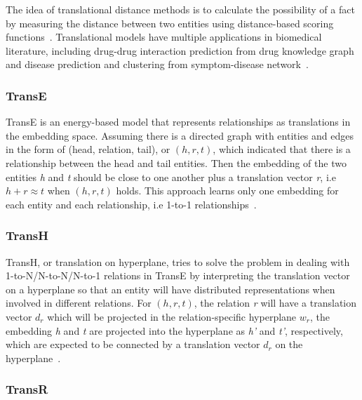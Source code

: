 The idea of translational distance methods is to calculate the possibility of a fact by measuring the distance between two entities using distance-based scoring functions~\cite{wang_knowledge_2017}.
Translational models have multiple applications in biomedical literature, including drug-drug interaction prediction from drug knowledge graph~\cite{abdelaziz_large-scale_2017, wang_predicting_2017} and disease prediction and clustering from symptom-disease network~\cite{zhao_contextcare:_2017}.

\subsubsection{TransE}

TransE is an energy-based model that represents relationships as translations in the embedding space.
Assuming there is a directed graph with entities and edges in the form of (head, relation, tail), or $(h, r, t)$, which indicated that there is a relationship between the head and tail entities.
Then the embedding of the two entities \textit{h} and \textit{t} should be close to one another plus a translation vector \textit{r}, i.e $h + r \approx t$ when $(h, r, t)$ holds.
This approach learns only one embedding for each entity and each relationship, i.e 1-to-1 relationships~\cite{bordes_translating_2013}.

\subsubsection{TransH}
TransH, or translation on hyperplane, tries to solve the problem in dealing with 1-to-N/N-to-N/N-to-1 relations in TransE by interpreting the translation vector on a hyperplane so that an entity will have distributed representations when involved in different relations.
For $(h, r, t)$, the relation \textit{r} will have a translation vector $d_{r}$ which will be projected in the relation-specific hyperplane $w_{r}$, the embedding \textit{h} and \textit{t} are projected into the hyperplane as \textit{h’} and \textit{t’}, respectively, which are expected to be connected by a translation vector $d_{r}$ on the hyperplane~\cite{wang_knowledge_2014}.

\subsubsection{TransR}

